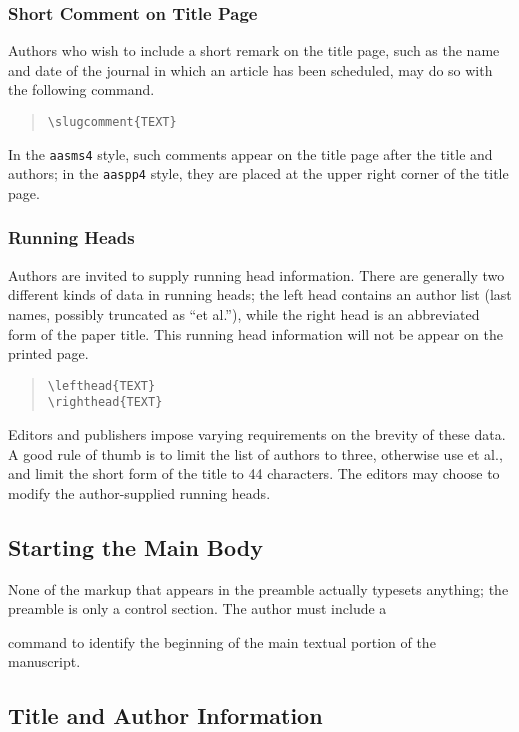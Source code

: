 \subsubsection{Short Comment on Title Page}

Authors who wish to include a short remark on the title page,
such as the name and date of the journal in which an article
has been scheduled, may do so with the following command.
\begin{quote}
\verb"\slugcomment{TEXT}"
\end{quote}
In the {\tt aasms4} style, such comments appear on the title page after the
title and authors;
in the {\tt aaspp4} style, they are placed at the upper right corner
of the title page.

\subsubsection{Running Heads}

Authors are invited to supply running head information.
There are generally two different kinds of data in running heads;
the left head contains an author list (last
names, possibly truncated as ``et al.''), while the right head
is an abbreviated form of the paper title.  This running head information will
not be appear on the printed page.
\begin{quote}
\verb"\lefthead{TEXT}"\\
\verb"\righthead{TEXT}"
\end{quote}
Editors and publishers impose varying requirements
on the brevity of these data.  A good rule of thumb is to limit the list
of authors to three, otherwise use et al., and limit the short form of the
title to 44 characters.  The editors may choose to modify the author-supplied
running heads.


\subsection{Starting the Main Body}

None of the markup that appears in the preamble actually typesets
anything; the preamble is only a control section.
The author must include a
\begin{quote}
\verb""
\end{quote}
command to identify the beginning of the main textual
portion of the manuscript.

\subsection{Title and Author Information}

